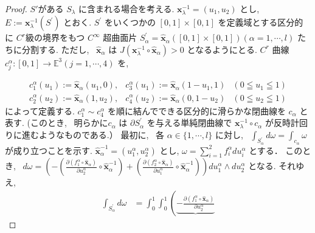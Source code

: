 \documentclass[12pt,a4j,final]{jreport}
\theoremstyle{definition}
\begin{document}
\begin{proof}
 $S'$がある $S_{\lambda}$ に含まれる場合を考える.
$\boldsymbol{x}_{\lambda}^{-1}=\left(u_{1}, u_{2}\right)$ とし, \ $E:=\boldsymbol{x}_{\lambda}^{-1}\left(S^{\prime}\right)$ とおく.
$S^{\prime}$ をいくつかの $[0,1] \times[0,1]$ を定義域とする区分的に $C^r$級の境界をもつ $C^{\infty}$ 超曲面片 $S_{\alpha}^{\prime}=\hat{\boldsymbol{x}}_{\alpha}([0,1] \times[0,1])(\alpha = 1, \cdots, l)$ たちに分割する.
ただし, \ $\hat{\boldsymbol{x}}_{\alpha}$ は $J\left(\boldsymbol{x}_{\lambda}^{-1} \circ \hat{\boldsymbol{x}}_{\alpha}\right)>0$ となるようにとる.
$C^{r}$ 曲線 $c_{j}^{\alpha}:[0,1] \rightarrow \mathbb{E}^{3}(j=1, \cdots, 4)$ を, \ 

$$
\begin{array}{lll}
c_{1}^{\alpha}\left(u_{1}\right):=\hat{\boldsymbol{x}}_{\alpha}\left(u_{1}, 0\right), & c_{3}^{\alpha}\left(u_{1}\right):=\hat{\boldsymbol{x}}_{\alpha}\left(1-u_{1}, 1\right) & \left(0 \leqq u_{1} \leqq 1\right) \\
c_{2}^{\alpha}\left(u_{2}\right):=\hat{\boldsymbol{x}}_{\alpha}\left(1, u_{2}\right), & c_{4}^{\alpha}\left(u_{2}\right):=\hat{\boldsymbol{x}}_{\alpha}\left(0,1-u_{2}\right) & \left(0 \leqq u_{2} \leqq 1\right)
\end{array}
$$
\noindent
によって定義する.
$c_{1}^\alpha \sim c_{4}^\alpha$ 
を順に結んでできる区分的に滑らかな閉曲線を
$c_\alpha$ と表す.
(このとき, \ 明らかに$c_\alpha$ は $\partial S_{\alpha}^{\prime}$ を与える単純閉曲線で
$\boldsymbol{x}_{\lambda}^{-1} \circ c_{\alpha}$ が反時計回りに進むようなものである.）
最初に, \ 各 $\alpha \in \{1, \cdots, l\}$ に対し, \  
$\displaystyle \int_{S_{\alpha}^{\prime}} d \omega = 
\int_{c_{\alpha}} \omega$ が成り立つことを示す.
$\hat{\boldsymbol{x}}_{\alpha}^{-1} = 
\left(u_{1}^{\alpha}, u_{2}^{\alpha}\right)$ とし,
$\omega = 
\displaystyle \sum_{i=1}^{2} f_{i}^{\alpha} d u_{i}^{\alpha}$
とする．
このとき, \ $d \omega=\left(-\left(\frac{\partial\left(f_{1}^{\alpha} \circ \hat{\boldsymbol{x}}_{\alpha}\right)}{\partial u_{2}^{\alpha}} \circ \hat{\boldsymbol{x}}_{\alpha}^{-1}\right)
+
\left(\frac{\partial\left(f_{2}^{\alpha} \circ \hat{\boldsymbol{x}}_{\alpha}\right)}{\partial u_{1}^{\alpha}} \circ \hat{\boldsymbol{x}}_{\alpha}^{-1}\right)\right) d u_{1}^{\alpha} \wedge d u_{2}^{\alpha}$ となる.
それゆえ, 
$$
\begin{aligned}
\displaystyle \int_{S_{\alpha}^{\prime}} d \omega 
&= 
\int_{0}^{1} \int_{0}^{1}
\left(
\underbrace{
-\frac{\partial (f_{1}^{\alpha} \circ \hat{\boldsymbol{x}}_{\alpha} )}{\partial u_{2}^{\alpha}}
}
\end{aligned}$$
\end{proof}
\end{document}
